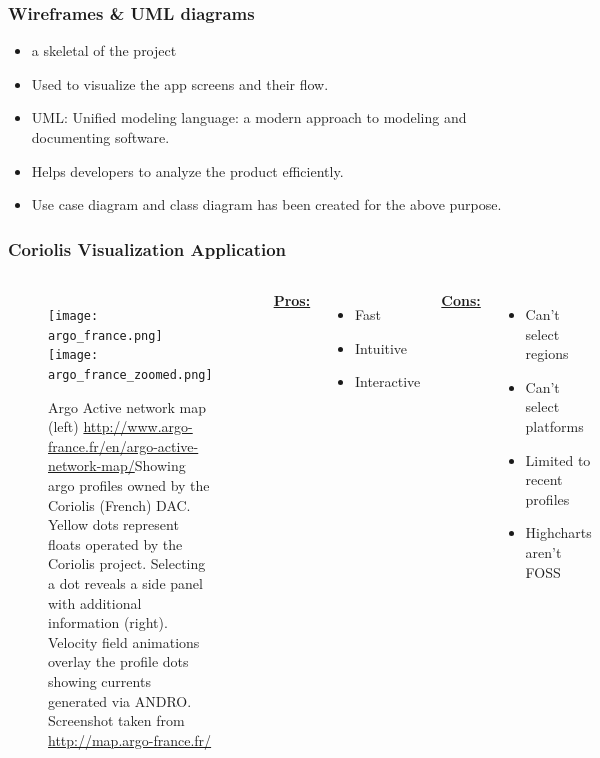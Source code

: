 \begin{frame}
\frametitle{Wireframes \& UML diagrams}
\begin{itemize}
    \item a skeletal of the project
    \item Used to visualize the app screens and their flow.
    \item UML: Unified modeling language: a modern approach to modeling and documenting software.
    \item Helps developers to analyze the product efficiently.
    \item Use case diagram and class diagram has been created for the above purpose.
\end{itemize}

\end{frame}








\begin{frame}
\frametitle{Coriolis Visualization Application}
\begin{columns}
\begin{figure}
\begin{minipage}{1\columnwidth}
\texttt{[image: argo\_france.png]}
\texttt{[image: argo\_france\_zoomed.png]}
\caption{\tiny{Argo Active network map (left) \url{http://www.argo-france.fr/en/argo-active-network-map/}Showing argo profiles owned by the Coriolis (French) DAC. Yellow dots represent floats operated by the Coriolis project. Selecting a dot reveals a side panel with additional information (right). Velocity field animations overlay the profile dots showing currents generated via ANDRO. Screenshot taken from \url{http://map.argo-france.fr/}}}
\end{minipage}
\end{figure}
\small{\underline{\textbf{Pros:}}}
\begin{itemize}
    \item Fast
    \item Intuitive
    \item Interactive
\end{itemize}
\small{\underline{\textbf{Cons:}}}
\begin{itemize}
    \item Can't select regions
    \item Can't select platforms
    \item Limited to recent profiles
    \item Highcharts aren't FOSS
\end{itemize}
\end{columns}
\end{frame}

